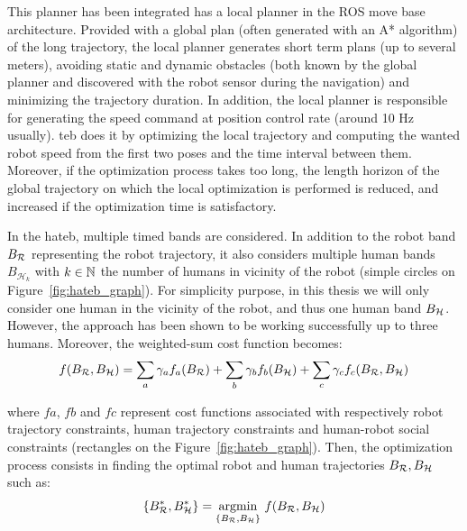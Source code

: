 \documentclass[a4paper,11pt,twoside]{StyleThese}
\begin{document}
This planner has been integrated has a local planner in the ROS move base architecture. Provided with a global plan (often generated with an A* algorithm) of the long trajectory, the local planner generates short term plans (up to several meters), avoiding static and dynamic obstacles (both known by the global planner and discovered with the robot sensor during the navigation) and minimizing the trajectory duration. In addition, the local planner is responsible for generating the speed command at position control rate (around 10 Hz usually). \acrshort{teb} does it by optimizing the local trajectory and computing the wanted robot speed from the first two poses and the time interval between them. Moreover, if the optimization process takes too long, the length horizon of the global trajectory on which the local optimization is performed is reduced, and increased if the optimization time is satisfactory.

In the \acrfull{hateb}, multiple timed bands are considered. In addition to the robot band $B_\mathcal{R}$ representing the robot trajectory, it also considers multiple human bands $B_{\mathcal{H}_k}$ with $k \in \mathbb{N}$ the number of humans in vicinity of the robot (simple circles on Figure~\ref{fig:hateb_graph}). For simplicity purpose, in this thesis we will only consider one human in the vicinity of the robot, and thus one human band $B_\mathcal{H}$. However, the approach has been shown to be working successfully up to three humans.
Moreover, the weighted-sum cost function becomes:
\begin{equation} \label{eq:hateb_obj_function}
f(B_\mathcal{R}, B_\mathcal{H}) = \sum_a \gamma_a f_a(B_\mathcal{R}) + \sum_b \gamma_b f_b(B_\mathcal{H}) + \sum_c \gamma_c f_c(B_\mathcal{R}, B_\mathcal{H})
\end{equation}   

where $fa$, $fb$ and $fc$ represent cost functions associated with respectively robot trajectory constraints, human trajectory constraints and human-robot social constraints (rectangles on the Figure~\ref{fig:hateb_graph}). Then, the optimization process consists in finding the optimal robot and human trajectories $B_\mathcal{R}, B_\mathcal{H}$ such as:
\[\{B_\mathcal{R}^*, B_\mathcal{H}^*\} = \mathop{\mathrm{argmin}}_{\{B_\mathcal{R}, B_\mathcal{H}\}}\,f(B_\mathcal{R}, B_\mathcal{H})\]
\end{document}
